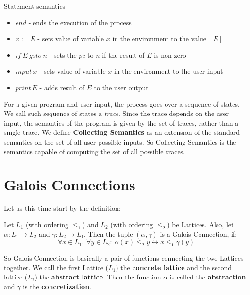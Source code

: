 \begin{defn} Statement semantics
    \begin{itemize}
        \item $end$ - ends the execution of the process
        \item $x := E$ - sets value of variable $x$ in the environment to the value $[E]$
        \item $if \: E \: goto \: n$ - sets the $pc$ to $n$ if the result of $E$ is non-zero
        \item $input \: x$ - sets value of variable $x$ in the environment to the user input
        \item $print \: E$ - adds result of $E$ to the user output
    \end{itemize}
\end{defn}


For a given program and user input, the process goes over a sequence of states.
We call such sequence of states a \textit{trace}.
Since the trace depends on the user input, the semantics of the program is given by the set of traces, rather than
a single trace.
We define \textbf{Collecting Semantics} as an extension of the standard semantics on the set of all user possible inputs.
So Collecting Semantics is the semantics capable of computing the set of all possible traces.



\section{Galois Connections} %

Let us this time start by the definition:

\begin{defn}
    Let $L_1$ (with ordering $\leq _1$) and $L_2$ (with ordering $\leq _2$) be Lattices. %
    Also, let $\alpha: L_1 \rightarrow L_2$ and $\gamma: L_2 \rightarrow L_1$.
    Then the tuple $(\alpha, \gamma)$ is a Galois Connection, if:
    \[ \forall x \in L_1, \: \forall y \in L_2: \: \alpha(x) \leq_2 y \leftrightarrow x \leq_1 \gamma(y)\]
\end{defn}

So Galois Connection is basically a pair of functions connecting the two Lattices together.
We call the first Lattice ($L_1$) the \textbf{concrete lattice} and the second lattice ($L_2$) the \textbf{abstract lattice}.
Then the function $\alpha$ is called the \textbf{abstraction} and $\gamma$ is the \textbf{concretization}.

